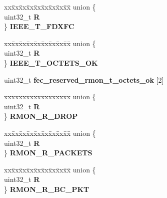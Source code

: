 \begin{DoxyCompactItemize}
\begin{tabbing}
\end{tabbing}\item 
\mbox{\label{structFEC__tag_abb809e12034c4f2c510877aa8eef83cb}} 
\begin{tabbing}
xx\=xx\=xx\=xx\=xx\=xx\=xx\=xx\=xx\=\kill
union \{\\
\>uint32\_t {\bfseries R}\\
\} {\bfseries IEEE\_T\_FDXFC}\\

\end{tabbing}\item 
\mbox{\label{structFEC__tag_ad8aeae9bac1857d0317efb40a58f222f}} 
\begin{tabbing}
xx\=xx\=xx\=xx\=xx\=xx\=xx\=xx\=xx\=\kill
union \{\\
\>uint32\_t {\bfseries R}\\
\} {\bfseries IEEE\_T\_OCTETS\_OK}\\

\end{tabbing}\item 
\mbox{\label{structFEC__tag_a86cb9261ad0e028ce911568066b888fb}} 
uint32\+\_\+t {\bfseries fec\+\_\+reserved\+\_\+rmon\+\_\+t\+\_\+octets\+\_\+ok} \mbox{[}2\mbox{]}
\item 
\mbox{\label{structFEC__tag_a6cc39ded0a7d9594f0cecbce70941c49}} 
\begin{tabbing}
xx\=xx\=xx\=xx\=xx\=xx\=xx\=xx\=xx\=\kill
union \{\\
\>uint32\_t {\bfseries R}\\
\} {\bfseries RMON\_R\_DROP}\\

\end{tabbing}\item 
\mbox{\label{structFEC__tag_aa39d40eb970a72f8a784908b2943c323}} 
\begin{tabbing}
xx\=xx\=xx\=xx\=xx\=xx\=xx\=xx\=xx\=\kill
union \{\\
\>uint32\_t {\bfseries R}\\
\} {\bfseries RMON\_R\_PACKETS}\\

\end{tabbing}\item 
\mbox{\label{structFEC__tag_ab5aef209a38b1616de8fa0dc08686a08}} 
\begin{tabbing}
xx\=xx\=xx\=xx\=xx\=xx\=xx\=xx\=xx\=\kill
union \{\\
\>uint32\_t {\bfseries R}\\
\} {\bfseries RMON\_R\_BC\_PKT}\\


\end{tabbing}
\end{DoxyCompactItemize}
